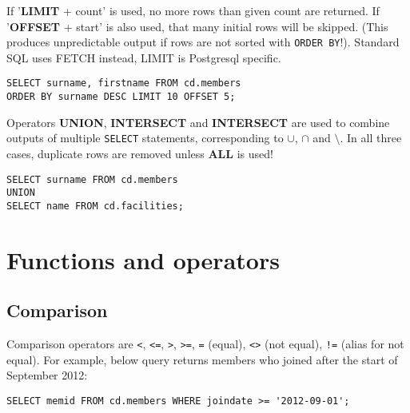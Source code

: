 \documentclass{charun}
\begin{document}
\begin{multicols*}{2}
If '\textbf{LIMIT} + count' is used, no more rows than given count are returned.
If '\textbf{OFFSET} + start' is also used, that many initial rows will be skipped.
(This produces unpredictable output if rows are not sorted with \texttt{ORDER BY}!).
Standard SQL uses FETCH instead, LIMIT is Postgresql specific.

\begin{verbatim}
SELECT surname, firstname FROM cd.members
ORDER BY surname DESC LIMIT 10 OFFSET 5;
\end{verbatim}

Operators \textbf{UNION}, \textbf{INTERSECT} and \textbf{INTERSECT} are used to combine outputs of multiple \texttt{SELECT} statements, corresponding to $\cup$, $\cap$ and $\setminus$.
In all three cases, duplicate rows are removed unless \textbf{ALL} is used!
\begin{verbatim}
SELECT surname FROM cd.members
UNION
SELECT name FROM cd.facilities;
\end{verbatim}















\section{Functions and operators}

\subsection{Comparison}
\label{subsection_comparison}%
Comparison operators are \texttt{<}, \texttt{<=}, \texttt{>}, \texttt{>=}, \texttt{=} (equal), \texttt{<>} (not equal), \texttt{!=} (alias for not equal).
For example, below query returns members who joined after the start of September 2012:
\begin{verbatim}
SELECT memid FROM cd.members WHERE joindate >= '2012-09-01';
\end{verbatim}


\end{multicols*}
\end{document}
